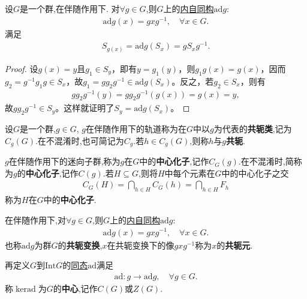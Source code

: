 \documentclass[../../main.tex]{subfiles}%
\begin{document}
\begin{theorem}\label{theorem:伴随作用下ad的定义}
设$G$是一个群,在伴随作用下.
对$\forall g\in G$,则$G$上的\hyperref[theorem:内自同构群及其基本性质-2]{内自同构}$\text{ad}g$:
\begin{align}\label{eq::--whiruhfeu8f2389jiosEAFgfeg}
\text{ad}g(x) = gxg^{-1}, \quad \forall x \in G.
\end{align}
满足
\begin{align*}
S_{g(x)} = \text{ad}g(S_x) = gS_xg^{-1}.
\end{align*}
\end{theorem}
\begin{proof}
设$g(x) = y$且$g_1 \in S_y$，即有$y = g_1(y)$，则$g_1g(x) = g(x)$，因而$g_2 = g^{-1}g_1g \in S_x$，故$g_1 = gg_2g^{-1} \in \text{ad}g(S_x)$。反之，若$g_2 \in S_x$，则有
\begin{align*}
gg_2g^{-1}(y) = gg_2g^{-1}(g(x)) = g(x) = y,
\end{align*}
故$gg_2g^{-1} \in S_y$。这样就证明了$S_y = \text{ad}g(S_x)$。
\end{proof}

\begin{definition}\label{definition:共轭和中心化子定义}
设$G$是一个群,$g \in G$, $g$在伴随作用下的轨道称为在$G$中以$g$为代表的\textbf{共轭类},记为$C_g(G)$.在不混淆时,也可简记为$C_g$.若$h \in C_g(G)$,则称$h$与$g$\textbf{共轭}.

$g$在伴随作用下的迷向子群,称为$g$在$G$中的\textbf{中心化子},记作$C_G(g)$.在不混淆时,简称为$g$的\textbf{中心化子},记作$C(g)$.若$H\subseteq G$,则将$H$中每个元素在$G$中的中心化子之交
\begin{align*}
C_G\left( H \right) =\bigcap_{h\in H}{C_G\left( h \right)}=\bigcap_{h\in H}{F_h}
\end{align*}
称为$H$在$G$中的\textbf{中心化子}.

在伴随作用下,对$\forall g\in G$,则$G$上的\hyperref[theorem:内自同构群及其基本性质-2]{内自同构}$\text{ad}g$:
\begin{align*}
\text{ad}g(x) = gxg^{-1}, \quad \forall x \in G.
\end{align*}
也称$\text{ad}g$为群$G$的\textbf{共轭变换},$x$在共轭变换下的像$gxg^{-1}$称为$x$的\textbf{共轭元}.

再定义$G$到$\text{Int}G$的\hyperref[theorem:内自同构群及其基本性质-4]{同态}$\text{ad}$满足
\begin{align*}
\text{ad}:g \to \text{ad}g,\quad \forall g\in G.
\end{align*}
称$\ker \text{ad}$为$G$的\textbf{中心},记作$C(G)$或$Z(G)$.
\end{definition}
\end{document}
